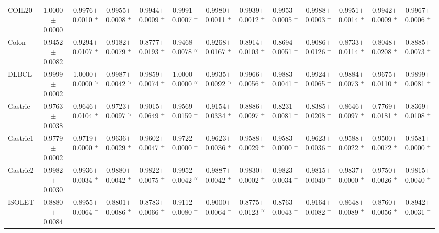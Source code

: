 \begin{table}
{\begin{tabular}{l *{12}{c}}
COIL20 & 1.0000$\pm$0.0000 & 0.9976$\pm$0.0010 $^{+}$ & 0.9955$\pm$0.0008 $^{+}$ & 0.9944$\pm$0.0009 $^{+}$ & 0.9991$\pm$0.0007 $^{+}$ & 0.9980$\pm$0.0011 $^{+}$ & 0.9939$\pm$0.0012 $^{+}$ & 0.9953$\pm$0.0005 $^{+}$ & 0.9988$\pm$0.0003 $^{+}$ & 0.9951$\pm$0.0014 $^{+}$ & 0.9942$\pm$0.0009 $^{+}$ & 0.9967$\pm$0.0006 $^{+}$ \\
Colon & 0.9452$\pm$0.0082 & 0.9294$\pm$0.0107 $^{+}$ & 0.9182$\pm$0.0079 $^{+}$ & 0.8777$\pm$0.0193 $^{+}$ & 0.9468$\pm$0.0078 $^{\approx}$ & 0.9268$\pm$0.0167 $^{+}$ & 0.8914$\pm$0.0103 $^{+}$ & 0.8694$\pm$0.0051 $^{+}$ & 0.9086$\pm$0.0126 $^{+}$ & 0.8733$\pm$0.0114 $^{+}$ & 0.8048$\pm$0.0208 $^{+}$ & 0.8885$\pm$0.0073 $^{+}$ \\
DLBCL & 0.9999$\pm$0.0002 & 1.0000$\pm$0.0000 $^{\approx}$ & 0.9987$\pm$0.0042 $^{\approx}$ & 0.9859$\pm$0.0074 $^{+}$ & 1.0000$\pm$0.0000 $^{\approx}$ & 0.9935$\pm$0.0092 $^{\approx}$ & 0.9966$\pm$0.0056 $^{+}$ & 0.9883$\pm$0.0041 $^{+}$ & 0.9924$\pm$0.0065 $^{+}$ & 0.9884$\pm$0.0073 $^{+}$ & 0.9675$\pm$0.0110 $^{+}$ & 0.9899$\pm$0.0081 $^{+}$ \\
Gastric & 0.9763$\pm$0.0038 & 0.9646$\pm$0.0104 $^{+}$ & 0.9723$\pm$0.0097 $^{\approx}$ & 0.9015$\pm$0.0649 $^{+}$ & 0.9569$\pm$0.0159 $^{+}$ & 0.9154$\pm$0.0334 $^{+}$ & 0.8886$\pm$0.0097 $^{+}$ & 0.8231$\pm$0.0081 $^{+}$ & 0.8385$\pm$0.0208 $^{+}$ & 0.8646$\pm$0.0097 $^{+}$ & 0.7769$\pm$0.0181 $^{+}$ & 0.8369$\pm$0.0108 $^{+}$ \\
Gastric1 & 0.9779$\pm$0.0002 & 0.9719$\pm$0.0000 $^{+}$ & 0.9636$\pm$0.0029 $^{+}$ & 0.9602$\pm$0.0047 $^{+}$ & 0.9722$\pm$0.0000 $^{+}$ & 0.9623$\pm$0.0036 $^{+}$ & 0.9588$\pm$0.0029 $^{+}$ & 0.9583$\pm$0.0000 $^{+}$ & 0.9623$\pm$0.0036 $^{+}$ & 0.9588$\pm$0.0022 $^{+}$ & 0.9500$\pm$0.0072 $^{+}$ & 0.9581$\pm$0.0000 $^{+}$ \\
Gastric2 & 0.9982$\pm$0.0030 & 0.9936$\pm$0.0034 $^{+}$ & 0.9880$\pm$0.0042 $^{+}$ & 0.9822$\pm$0.0075 $^{+}$ & 0.9952$\pm$0.0042 $^{\approx}$ & 0.9887$\pm$0.0042 $^{+}$ & 0.9830$\pm$0.0002 $^{+}$ & 0.9823$\pm$0.0034 $^{+}$ & 0.9815$\pm$0.0040 $^{+}$ & 0.9837$\pm$0.0000 $^{+}$ & 0.9750$\pm$0.0026 $^{+}$ & 0.9815$\pm$0.0040 $^{+}$ \\
ISOLET & 0.8880$\pm$0.0084 & 0.8955$\pm$0.0064 $^{-}$ & 0.8801$\pm$0.0086 $^{+}$ & 0.8783$\pm$0.0066 $^{+}$ & 0.9112$\pm$0.0080 $^{-}$ & 0.9000$\pm$0.0064 $^{-}$ & 0.8775$\pm$0.0123 $^{\approx}$ & 0.8763$\pm$0.0043 $^{+}$ & 0.9164$\pm$0.0082 $^{-}$ & 0.8648$\pm$0.0089 $^{+}$ & 0.8760$\pm$0.0056 $^{+}$ & 0.8942$\pm$0.0031 $^{-}$ \\

\end{tabular}}
\end{table}
